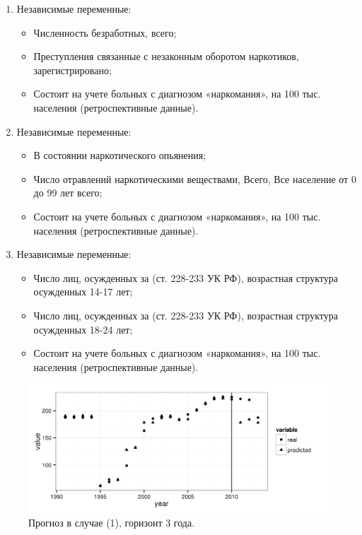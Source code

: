 \begin{enumerate}
    \item Независимые переменные:
    \begin{itemize}
        \item Численность безработных, всего;
        \item Преступления связанные с незаконным оборотом наркотиков, 
            зарегистрировано;
        \item Состоит на учете больных с диагнозом «наркомания», на 100 тыс. 
            населения (ретроспективные данные).
    \end{itemize}
    \item Независимые переменные:
    \begin{itemize}
        \item В состоянии наркотического опьянения;
        \item Число отравлений наркотическими веществами, Всего, Все население 
            от 0 до 99 лет  всего;
        \item Состоит на учете больных с диагнозом «наркомания», на 100 тыс. 
            населения (ретроспективные данные).
    \end{itemize}
    \item Независимые переменные:
    \begin{itemize}
        \item Число лиц, осужденных за (ст. 228-233 УК РФ), возрастная структура 
            осужденных  14-17 лет;
        \item Число лиц, осужденных за (ст. 228-233 УК РФ), возрастная структура 
            осужденных  18-24 лет;
        \item Состоит на учете больных с диагнозом «наркомания», на 100 тыс. 
            населения (ретроспективные данные).
    \end{itemize}			
\end{enumerate}

\begin{figure}[bhtp]
    \begin{center}
        \includegraphics{images/m_plot1.png}
        \caption{Прогноз в случае (1), горизонт 3 года.}		
        \label{figure:m_plot1}
    \end{center}
\end{figure}

